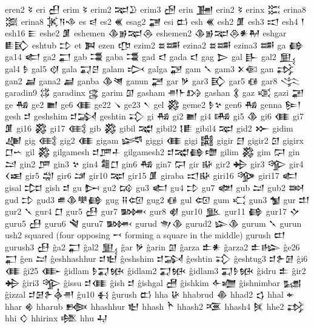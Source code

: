  eren2  𒂟   
 eri  𒌷   
 erim  𒂟   
 erim2  𒉈𒊒    
 erim3  𒌿   
 erin  𒂞   
 erin2  𒂟   
 erinx  𒈶   
 erina8  𒈷   
 erina8  𒈸𒀀𒈾    
 es  𒁀   
 es2  𒌍   
 esag2  𒃥   
 esi  𒆗   
 esh  𒌍   
 esh2  𒂠   
 esh3  𒀊   
 esh4  𒁹   
 esh16  𒀼   
 eshe2  𒂠   
 eshemen  𒆠𒂊𒉈𒁲    
 eshemen2  𒆠𒂊𒉈𒁲𒀭𒈹    
 eshgar  𒀾𒃼    
 eshtub  𒄞   
 et  𒀉   
 ezen  𒂡   
 ezim2  𒊺𒌁    
 ezina2  𒊺𒌁    
 ezina3  𒌁   
 ga  𒂵   
 ga14  𒅗   
 ga2  𒂷   
 gab  𒃮   
 gaba  𒃮   
 gad  𒃰   
 gada  𒃰   
 gag  𒆕   
 gal  𒃲   
 gal2  𒅅   
 gal4  𒊩   
 gal5  𒋼   
 gala  𒍑𒆪    
 galam  𒃴   
 galga  𒃌   
 gam  𒃵   
 gam3  𒉽𒈿    
 gan  𒃶   
 gan2  𒃷   
 gana2  𒃷   
 ganba  𒆠𒇴    
 ganun  𒃠   
 gar  𒃻   
 gar3  𒃼   
 gar5  𒈖   
 gar8  𒋞   
 garadin9  𒌏   
 garadinx  𒃱   
 garim  𒇑   
 gasham  𒉣𒈨𒋳    
 gashan  𒃽   
 gaz  𒄤   
 gazi  𒃢   
 ge  𒄀   
 ge2  𒆤   
 ge6  𒈪   
 ge22  𒀺   
 ge23  𒀹   
 gel  𒄃   
 geme2  𒊩𒆳    
 gen6  𒄀   
 genna  𒌉𒁹    
 gesh  𒄑   
 geshshim  𒄑𒋆    
 geshtin  𒃾   
 gi  𒄀   
 gi2  𒆤   
 gi4  𒄄   
 gi5  𒆠   
 gi6  𒈪   
 gi7  𒂠   
 gi16  𒄃   
 gi17  𒍼   
 gib  𒄃   
 gibil  𒉋   
 gibil2  𒋙𒀾    
 gibil4  𒉈   
 gid2  𒁍   
 gidim  𒄇   
 gig  𒍼   
 gig2  𒈪   
 gigam  𒈓   
 giggi  𒈪   
 gigi  𒄅   
 gigir  𒇀   
 gigir2  𒇥   
 gigirx  𒆸𒌀      
 gil  𒄃   
 gilgamesh  𒄑𒂆𒈦    
 gilgamesh2  𒄑𒉋𒂵𒈩    
 gilim  𒄃   
 gim  𒁶   
 gin  𒁺   
 gin2  𒂆   
 gin3  𒆳   
 gin4  𒍤𒆸    
 gin6  𒄀   
 gin7  𒁶   
 gir  𒄫   
 gir2  𒄈   
 gir3  𒄊   
 gir4  𒌋𒀜    
 gir5  𒁽   
 gir6  𒁼   
 gir10  𒉈   
 gir15  𒂠   
 giraba  𒀊𒄫    
 giri16  𒄌   
 giri17  𒅗   
 gisal  𒄐   
 gish  𒄑   
 gu  𒄖   
 gu2  𒄘   
 gu3  𒅗   
 gu4  𒄞   
 gu7  𒅥   
 gub  𒁺   
 gub2  𒇷   
 gud  𒄞   
 gud3  𒌑𒆠𒋧𒂵    
 gug  𒍝𒄢    
 gug2  𒈖   
 gul  𒄢   
 gum  𒄣   
 gun3  𒁯   
 gur  𒄥   
 gur2  𒃵   
 gur4  𒆸   
 gur5  𒍀   
 gur7  𒄦   
 gur8  𒋽   
 gur10  𒆥   
 gur11  𒂵   
 gur17  𒄕   
 guru5  𒍀   
 guru6  𒃸   
 guru7  𒄦   
 gurud  𒉩𒆠    
 gurud2  𒇽𒆠    
 gurum  𒃵   
 gurun  ush2 squared (four opposing 𒍗 forming a square in the  
   middle)   
 gurush  𒄨   
 gurush3  𒍀   
 ĝa2  𒂷   
 ĝal2  𒅅   
 ĝar  𒃻   
 ĝarin  𒇑   
 ĝarza  𒉺𒀭    
 ĝarza2  𒉺𒈗    
 ĝe26  𒂷   
 ĝen  𒁺   
 ĝeshhashhur  𒄑𒈢    
 ĝeshshim  𒄑𒋆    
 ĝeshtin  𒃾   
 ĝeshtug3  𒄑𒉿𒌆    
 ĝi6  𒈪   
 ĝi25  𒂂   
 ĝidlam  𒊩𒍑𒁮    
 ĝidlam2  𒍑𒁮    
 ĝidlam3  𒍑𒊩𒁮    
 ĝidru  𒉺   
 ĝir2  𒄈   
 ĝiri3  𒄊   
 ĝissu  𒄑𒈪    
 ĝish  𒄑   
 ĝishgal  𒍇   
 ĝishkim  𒅆𒁾    
 ĝishnimbar  𒊷   
 ĝizzal  𒄑𒌆𒉿𒎓𒉣    
 ĝu10  𒈬   
 ĝurush  𒆗   
 hha  𒄩   
 hhabrud  𒆢   
 hhad2  𒌓   
 hhal  𒄬   
 hhar  𒄯   
 hharub  𒁬   
 hhashhur  𒈢   
 hhash  𒋻   
 hhash2  𒍨   
 hhash4  𒍮   
 hhe2  𒃶   
 hhi  𒄭   
 hhirinx  𒆶   
 hhu  𒄷   
